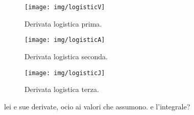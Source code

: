 \begin{figure}[pbh]
    \centering
    \texttt{[image: img/logisticV]}

    \caption{Derivata logistica prima.}
    \label{img:logisticV}
\end{figure}
\begin{figure}[pbh]
    \centering
    \texttt{[image: img/logisticA]}

    \caption{Derivata logistica seconda.}
    \label{img:logisticA}
\end{figure}
\begin{figure}[pbh]
    \centering
    \texttt{[image: img/logisticJ]}

    \caption{Derivata logistica terza.}
    \label{img:logisticJ}
\end{figure}

lei e sue derivate, ocio ai valori che assumono.
e l'integrale?

